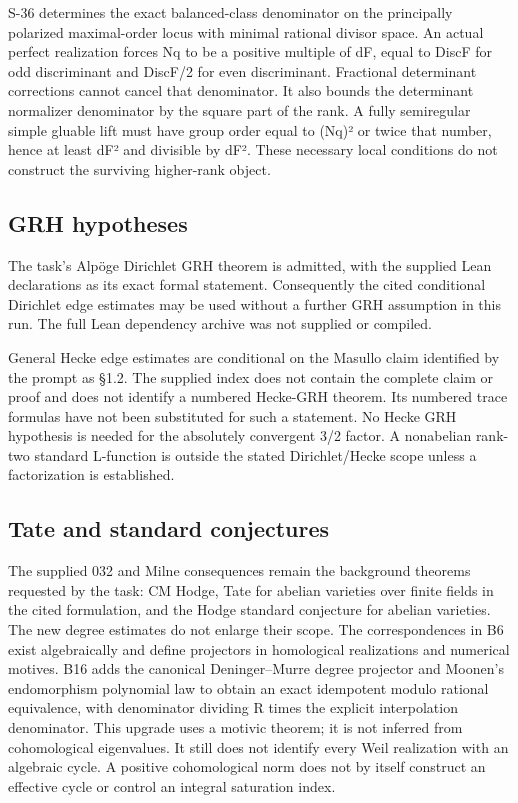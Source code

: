 \documentclass[11pt,a4paper]{article}
\theoremstyle{definition}
\begin{document}
S-36 determines the exact balanced-class denominator on the principally
polarized maximal-order locus with minimal rational divisor space. An
actual perfect realization forces Nq to be a positive multiple of dF,
equal to DiscF for odd discriminant and DiscF/2 for even discriminant.
Fractional determinant corrections cannot cancel that denominator. It
also bounds the determinant normalizer denominator by the square part of
the rank. A fully semiregular simple gluable lift must have group order
equal to (Nq)² or twice that number, hence at least dF² and divisible by
dF². These necessary local conditions do not construct the surviving
higher-rank object.

\subsection{GRH hypotheses}\label{IMPLICATIONS-grh-hypotheses}

The task's Alpöge Dirichlet GRH theorem is admitted, with the supplied
Lean declarations as its exact formal statement. Consequently the cited
conditional Dirichlet edge estimates may be used without a further GRH
assumption in this run. The full Lean dependency archive was not
supplied or compiled.

General Hecke edge estimates are conditional on the Masullo claim
identified by the prompt as §1.2. The supplied index does not contain
the complete claim or proof and does not identify a numbered Hecke-GRH
theorem. Its numbered trace formulas have not been substituted for such
a statement. No Hecke GRH hypothesis is needed for the absolutely
convergent 3/2 factor. A nonabelian rank-two standard L-function is
outside the stated Dirichlet/Hecke scope unless a factorization is
established.

\subsection{Tate and standard
conjectures}\label{IMPLICATIONS-tate-and-standard-conjectures}

The supplied 032 and Milne consequences remain the background theorems
requested by the task: CM Hodge, Tate for abelian varieties over finite
fields in the cited formulation, and the Hodge standard conjecture for
abelian varieties. The new degree estimates do not enlarge their scope.
The correspondences in B6 exist algebraically and define projectors in
homological realizations and numerical motives. B16 adds the canonical
Deninger--Murre degree projector and Moonen's endomorphism polynomial
law to obtain an exact idempotent modulo rational equivalence, with
denominator dividing R times the explicit interpolation denominator.
This upgrade uses a motivic theorem; it is not inferred from
cohomological eigenvalues. It still does not identify every Weil
realization with an algebraic cycle. A positive cohomological norm does
not by itself construct an effective cycle or control an integral
saturation index.
\end{document}
